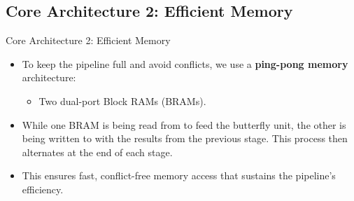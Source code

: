 \documentclass[
	10pt, t,
	hyperref={
		colorlinks,
		citecolor=CtpLatteTeal,
		linkcolor=CtpLatteTeal,
		urlcolor=CtpLatteBlue,
		pdfauthor={Bardia Taghavi},
		pdftitle={LightNTT: A Tiny NTT/iNTT Core for ML-DSA Featuring a Constant-Geometry Pipelined Design},
		pdfsubject={Cryptography},
		pdfkeywords={NTT, iNTT, ML-DSA, Constant-Geometry Pipelined Design},
		pdfcreator={Bardia Taghavi},
		pdfproducer={Bardia Taghavi}
		},
	aspectratio=1610,
	]
	{beamer}
\begin{document}
\subsection{Core Architecture 2: Efficient Memory}
\begin{frame}{Core Architecture 2: Efficient Memory}
	\begin{itemize}\setlength{\itemsep}{1em}
		\item To keep the pipeline full and avoid conflicts, we use a \textbf{ping-pong memory} architecture:
		\begin{itemize}\vspace{1ex}
			\item Two dual-port Block RAMs (BRAMs).
		\end{itemize}
		\item While one BRAM is being read from to feed the butterfly unit, the other is being written to with the results from the previous stage. This process then alternates at the end of each stage.
		\item This ensures fast, conflict-free memory access that sustains the pipeline's efficiency.
	\end{itemize}
	\begin{figure}
	\end{figure}
\end{frame}
\end{document}
